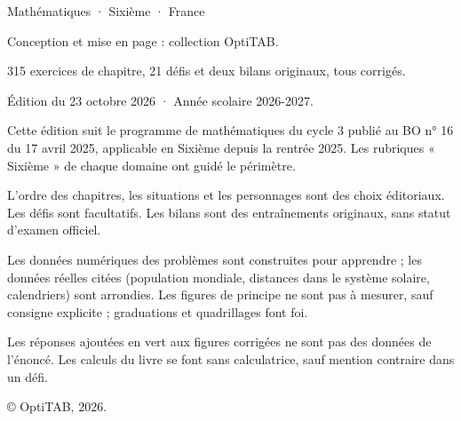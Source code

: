 \thispagestyle{empty}\vspace*{\fill}
\begin{minipage}{128mm}\fontsize{9}{13}\selectfont\color{otMuted}
{\otSemi\color{otInk}Mathématiques · Sixième · France}\par\medskip
Conception et mise en page : collection OptiTAB.\par
315 exercices de chapitre, 21 défis et deux bilans originaux, tous corrigés.\par
Édition du 23 octobre 2026 · Année scolaire 2026-2027.\par\bigskip
Cette édition suit le programme de mathématiques du cycle 3 publié au
BO n° 16 du 17 avril 2025, applicable en Sixième depuis la rentrée 2025.
Les rubriques « Sixième » de chaque domaine ont guidé le périmètre.\par\bigskip
L’ordre des chapitres, les situations et les personnages sont des choix
éditoriaux. Les défis sont facultatifs. Les bilans sont des entraînements
originaux, sans statut d’examen officiel.\par\bigskip
Les données numériques des problèmes sont construites pour apprendre ;
les données réelles citées (population mondiale, distances dans le
système solaire, calendriers) sont arrondies. Les figures de principe ne
sont pas à mesurer, sauf consigne explicite ; graduations et quadrillages
font foi.\par\bigskip
Les réponses ajoutées en vert aux figures corrigées ne sont pas des données
de l’énoncé. Les calculs du livre se font sans calculatrice, sauf mention
contraire dans un défi.\par\bigskip
© OptiTAB, 2026.\par\otSite
\end{minipage}\clearpage
